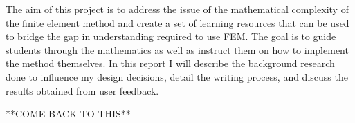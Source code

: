 
The aim of this project is to address the issue of the mathematical complexity of the finite element method and create a set of learning resources that can be used to bridge the gap in understanding required to use FEM. The goal is to guide students through the mathematics as well as instruct them on how to implement the method themselves. In this report I will describe the background research done to influence my design decisions, detail the writing process, and discuss the results obtained from user feedback.

**COME BACK TO THIS**
